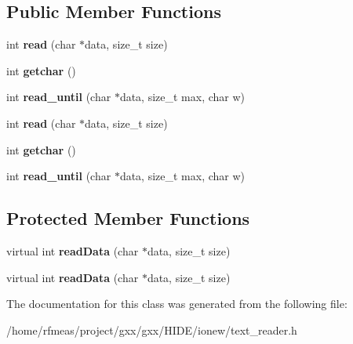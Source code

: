\subsection*{Public Member Functions}
\begin{DoxyCompactItemize}
\item 
int {\bfseries read} (char $\ast$data, size\+\_\+t size)\hypertarget{classgxx_1_1io_1_1text__reader_a63e842efd622641294d74144e8c1d593}{}\label{classgxx_1_1io_1_1text__reader_a63e842efd622641294d74144e8c1d593}

\item 
int {\bfseries getchar} ()\hypertarget{classgxx_1_1io_1_1text__reader_a4a66678826b1a46f9e0ca2369347ddfa}{}\label{classgxx_1_1io_1_1text__reader_a4a66678826b1a46f9e0ca2369347ddfa}

\item 
int {\bfseries read\+\_\+until} (char $\ast$data, size\+\_\+t max, char w)\hypertarget{classgxx_1_1io_1_1text__reader_a8ae70d7befaa52a3559d7d24eb2d9d55}{}\label{classgxx_1_1io_1_1text__reader_a8ae70d7befaa52a3559d7d24eb2d9d55}

\item 
int {\bfseries read} (char $\ast$data, size\+\_\+t size)\hypertarget{classgxx_1_1io_1_1text__reader_a63e842efd622641294d74144e8c1d593}{}\label{classgxx_1_1io_1_1text__reader_a63e842efd622641294d74144e8c1d593}

\item 
int {\bfseries getchar} ()\hypertarget{classgxx_1_1io_1_1text__reader_a4a66678826b1a46f9e0ca2369347ddfa}{}\label{classgxx_1_1io_1_1text__reader_a4a66678826b1a46f9e0ca2369347ddfa}

\item 
int {\bfseries read\+\_\+until} (char $\ast$data, size\+\_\+t max, char w)\hypertarget{classgxx_1_1io_1_1text__reader_a8ae70d7befaa52a3559d7d24eb2d9d55}{}\label{classgxx_1_1io_1_1text__reader_a8ae70d7befaa52a3559d7d24eb2d9d55}

\end{DoxyCompactItemize}
\subsection*{Protected Member Functions}
\begin{DoxyCompactItemize}
\item 
virtual int {\bfseries read\+Data} (char $\ast$data, size\+\_\+t size)\hypertarget{classgxx_1_1io_1_1text__reader_a52af04188ee68577e942e27ae59ae95f}{}\label{classgxx_1_1io_1_1text__reader_a52af04188ee68577e942e27ae59ae95f}

\item 
virtual int {\bfseries read\+Data} (char $\ast$data, size\+\_\+t size)\hypertarget{classgxx_1_1io_1_1text__reader_a52af04188ee68577e942e27ae59ae95f}{}\label{classgxx_1_1io_1_1text__reader_a52af04188ee68577e942e27ae59ae95f}

\end{DoxyCompactItemize}


The documentation for this class was generated from the following file\+:\begin{DoxyCompactItemize}
\item 
/home/rfmeas/project/gxx/gxx/\+H\+I\+D\+E/ionew/text\+\_\+reader.\+h\end{DoxyCompactItemize}
